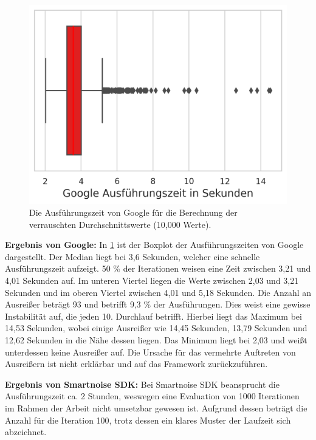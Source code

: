 \begin{figure}[htbp]
	\centering
	\includegraphics[scale=0.6]{./images/boxplot_google.png}
	\caption{Die Ausführungszeit von Google für die Berechnung der verrauschten Durchschnittswerte (10,000 Werte).}
	\label{fig:boxplot_google}
\end{figure}

\textbf{Ergebnis von Google:}
In \cref{fig:boxplot_google} ist der Boxplot der Ausführungszeiten von Google dargestellt. Der Median liegt bei 3,6 Sekunden, welcher eine schnelle Ausführungszeit aufzeigt. 50 \% der Iterationen weisen eine Zeit zwischen 3,21 und 4,01 Sekunden auf. Im unteren Viertel liegen die Werte zwischen 2,03 und 3,21 Sekunden und im oberen Viertel zwischen 4,01 und 5,18 Sekunden. Die Anzahl an Ausreißer beträgt 93 und betrifft 9,3 \% der Ausführungen. Dies weist eine gewisse Instabilität auf, die jeden 10. Durchlauf betrifft. Hierbei liegt das Maximum bei 14,53 Sekunden, wobei einige Ausreißer wie 14,45 Sekunden, 13,79 Sekunden und 12,62 Sekunden in die Nähe dessen liegen. Das Minimum liegt bei 2,03 und weißt unterdessen keine Ausreißer auf. Die Ursache für das vermehrte Auftreten von Ausreißern ist nicht erklärbar und auf das Framework zurückzuführen.

\textbf{Ergebnis von Smartnoise SDK:}
Bei Smartnoise SDK beansprucht die Ausführungszeit ca. 2 Stunden, weswegen eine Evaluation von 1000 Iterationen im Rahmen der Arbeit nicht umsetzbar gewesen ist. Aufgrund dessen beträgt die Anzahl für die Iteration 100, trotz dessen ein klares Muster der Laufzeit sich abzeichnet.

